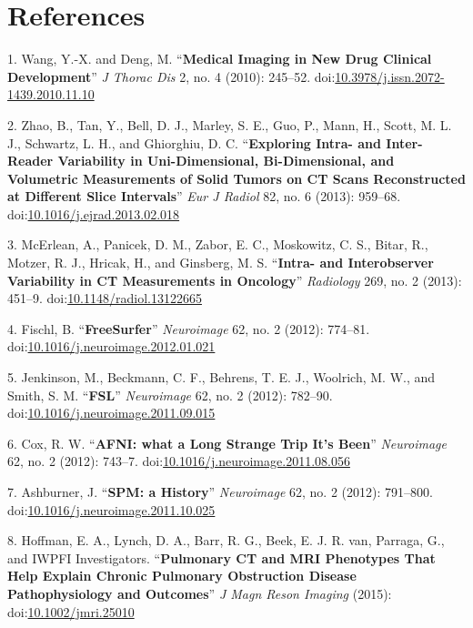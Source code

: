 \documentclass[11pt,]{article}
\begin{document}
\section*{References}\label{references}

1. Wang, Y.-X. and Deng, M. ``\textbf{Medical Imaging in New Drug
Clinical Development}'' \emph{J Thorac Dis} 2, no. 4 (2010): 245--52.
doi:\href{http://dx.doi.org/10.3978/j.issn.2072-1439.2010.11.10}{10.3978/j.issn.2072-1439.2010.11.10}

2. Zhao, B., Tan, Y., Bell, D. J., Marley, S. E., Guo, P., Mann, H.,
Scott, M. L. J., Schwartz, L. H., and Ghiorghiu, D. C.
``\textbf{Exploring Intra- and Inter-Reader Variability in
Uni-Dimensional, Bi-Dimensional, and Volumetric Measurements of Solid
Tumors on CT Scans Reconstructed at Different Slice Intervals}''
\emph{Eur J Radiol} 82, no. 6 (2013): 959--68.
doi:\href{http://dx.doi.org/10.1016/j.ejrad.2013.02.018}{10.1016/j.ejrad.2013.02.018}

3. McErlean, A., Panicek, D. M., Zabor, E. C., Moskowitz, C. S., Bitar,
R., Motzer, R. J., Hricak, H., and Ginsberg, M. S. ``\textbf{Intra- and
Interobserver Variability in CT Measurements in Oncology}''
\emph{Radiology} 269, no. 2 (2013): 451--9.
doi:\href{http://dx.doi.org/10.1148/radiol.13122665}{10.1148/radiol.13122665}

4. Fischl, B. ``\textbf{FreeSurfer}'' \emph{Neuroimage} 62, no. 2
(2012): 774--81.
doi:\href{http://dx.doi.org/10.1016/j.neuroimage.2012.01.021}{10.1016/j.neuroimage.2012.01.021}

5. Jenkinson, M., Beckmann, C. F., Behrens, T. E. J., Woolrich, M. W.,
and Smith, S. M. ``\textbf{FSL}'' \emph{Neuroimage} 62, no. 2 (2012):
782--90.
doi:\href{http://dx.doi.org/10.1016/j.neuroimage.2011.09.015}{10.1016/j.neuroimage.2011.09.015}

6. Cox, R. W. ``\textbf{AFNI: what a Long Strange Trip It's Been}''
\emph{Neuroimage} 62, no. 2 (2012): 743--7.
doi:\href{http://dx.doi.org/10.1016/j.neuroimage.2011.08.056}{10.1016/j.neuroimage.2011.08.056}

7. Ashburner, J. ``\textbf{SPM: a History}'' \emph{Neuroimage} 62, no. 2
(2012): 791--800.
doi:\href{http://dx.doi.org/10.1016/j.neuroimage.2011.10.025}{10.1016/j.neuroimage.2011.10.025}

8. Hoffman, E. A., Lynch, D. A., Barr, R. G., Beek, E. J. R. van,
Parraga, G., and IWPFI Investigators. ``\textbf{Pulmonary CT and MRI
Phenotypes That Help Explain Chronic Pulmonary Obstruction Disease
Pathophysiology and Outcomes}'' \emph{J Magn Reson Imaging} (2015):
doi:\href{http://dx.doi.org/10.1002/jmri.25010}{10.1002/jmri.25010}
\end{document}
